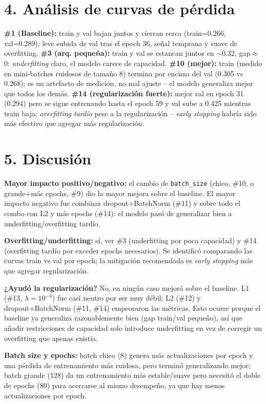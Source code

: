 \documentclass[9pt]{extarticle}
\begin{document}
\section*{4. Análisis de curvas de pérdida}
\textbf{\#1 (Baseline):} train y val bajan juntos y cierran cerca (train=0.266, val=0.289); leve subida de val tras el epoch 36, señal temprana y suave de overfitting. \textbf{\#3 (arq. pequeña):} train y val se estancan juntos en $\sim$0.32, gap$\approx$0: \emph{underfitting} claro, el modelo carece de capacidad. \textbf{\#10 (mejor):} train (medido en mini-batches ruidosos de tamaño 8) termina por encima del val (0.305 vs 0.268); es un artefacto de medición, no mal ajuste -- el modelo generaliza mejor que todos los demás. \textbf{\#14 (regularización fuerte):} mejor val en epoch 31 (0.294) pero se sigue entrenando hasta el epoch 59 y val sube a 0.425 mientras train baja; \emph{overfitting tardío} pese a la regularización -- \emph{early stopping} habría sido más efectivo que agregar más regularización.

\section*{5. Discusión}
\textbf{Mayor impacto positivo/negativo:} el cambio de \texttt{batch\_size} (chico, \#10, o grande+más epochs, \#9) dio la mayor mejora sobre el baseline. El mayor impacto negativo fue combinar dropout+BatchNorm (\#11) y sobre todo el combo con L2 y más epochs (\#14): el modelo pasó de generalizar bien a underfitting/overfitting tardío.

\textbf{Overfitting/underfitting:} sí, ver \#3 (underfitting por poca capacidad) y \#14 (overfitting tardío por exceder epochs necesarios). Se identificó comparando las curvas train vs val por epoch; la mitigación recomendada es \emph{early stopping} más que agregar regularización.

\textbf{¿Ayudó la regularización?} No, en ningún caso mejoró sobre el baseline. L1 (\#13, $\lambda=10^{-4}$) fue casi neutro por ser muy débil; L2 (\#12) y dropout+BatchNorm (\#11, \#14) empeoraron las métricas. Esto ocurre porque el baseline ya generaliza razonablemente bien (gap train/val pequeño), así que añadir restricciones de capacidad solo introduce underfitting en vez de corregir un overfitting que apenas existía.

\textbf{Batch size y epochs:} batch chico (8) genera más actualizaciones por epoch y una pérdida de entrenamiento más ruidosa, pero terminó generalizando mejor; batch grande (128) da un entrenamiento más estable/suave pero necesitó el doble de epochs (80) para acercarse al mismo desempeño, ya que hay menos actualizaciones por epoch.
\end{document}
